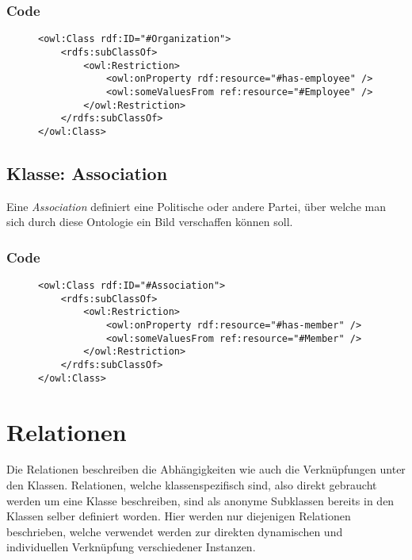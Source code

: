 \documentclass[
    11pt,
    latin1,
    a4paper,
    oneside
]{scrreprt}
\begin{document}
\subsubsection{Code} \label{sec:class_organization_code}

\begin{figure}[h]
 \lstset{language=XML}
 \begin{lstlisting}[label=owl:word]
<owl:Class rdf:ID="#Organization">
	<rdfs:subClassOf>
		<owl:Restriction>
			<owl:onProperty rdf:resource="#has-employee" />
			<owl:someValuesFrom ref:resource="#Employee" />
		</owl:Restriction>
	</rdfs:subClassOf>
</owl:Class>
 \end{lstlisting}
\end{figure}


\subsection{Klasse: Association} \label{sec:class_association}

Eine \emph{Association} definiert eine Politische oder andere Partei, über welche man sich durch diese Ontologie ein Bild verschaffen k\"onnen soll.

\subsubsection{Code} \label{sec:class_association_code}

\begin{figure}[h]
 \lstset{language=XML}
 \begin{lstlisting}[label=owl:word]
<owl:Class rdf:ID="#Association">
	<rdfs:subClassOf>
		<owl:Restriction>
			<owl:onProperty rdf:resource="#has-member" />
			<owl:someValuesFrom ref:resource="#Member" />
		</owl:Restriction>
	</rdfs:subClassOf>
</owl:Class>
 \end{lstlisting}
\end{figure}



\section{Relationen} \label{sec:reltations}

Die Relationen beschreiben die Abh\"angigkeiten wie auch die Verkn\"upfungen unter den Klassen. Relationen, welche klassenspezifisch sind, also direkt gebraucht werden um eine Klasse beschreiben, sind als anonyme Subklassen bereits in den Klassen selber definiert worden. Hier werden nur diejenigen Relationen beschrieben, welche verwendet werden zur direkten dynamischen und individuellen Verkn\"upfung verschiedener Instanzen.
\end{document}
